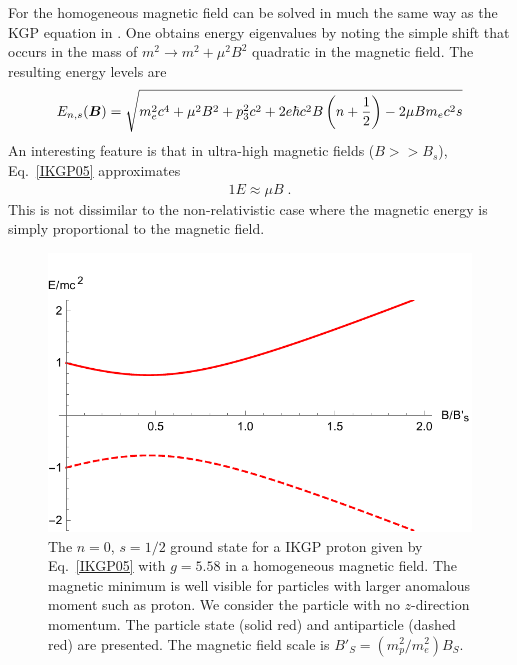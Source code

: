 For the homogeneous magnetic field  can be solved in much the same way as the KGP equation in . One obtains energy eigenvalues by noting the simple shift that occurs in the mass of $m^2\rightarrow m^{2}+\mu^{2}{B}^{2}$ quadratic in the magnetic field. The resulting energy levels are
\begin{alignat}{1}
\label{IKGP05} E_{n,s}(\boldsymbol{B})=\sqrt{m_{e}^{2}c^{4}+\mu^{2}{B}^{2}+p_{3}^{2}c^{2}+2e\hbar c^{2}B\left(n+\frac{1}{2}\right)-2\mu B m_{e}c^{2}s}
\end{alignat}
An interesting feature is that in ultra-high magnetic fields ($B>>{B}_{s}$), Eq.~\eqref{IKGP05} approximates
\begin{alignat}{1}
\label{IKGP07} E\approx\mu B\;.
\end{alignat}
This is not dissimilar to the non-relativistic case where the magnetic energy is simply proportional to the magnetic field.

\begin{figure}[ht]
 \centering
 \includegraphics[clip, trim=0.0cm 0.0cm 0.0cm 0.5cm,width=\linewidth]{plots/chap02moment/lanplot09.pdf}
 \caption{The $n=0$, $s=1/2$ ground state for a IKGP proton given by Eq.~\eqref{IKGP05} with $g=5.58$ in a homogeneous magnetic field. The magnetic minimum is well visible for particles with larger anomalous moment such as proton. We consider the particle with no $z$-direction momentum. The particle state (solid red) and antiparticle (dashed red) are presented. The magnetic field scale is ${B}'_{S}=(m^2_p/m^2_e){B}_S$.}
\label{f05}
\end{figure}

